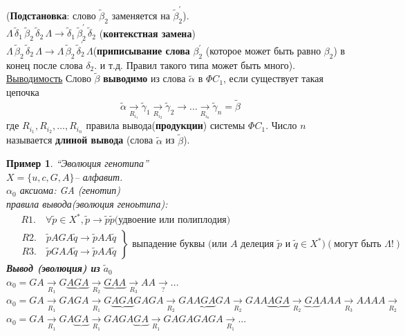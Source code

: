 \documentclass{article}
\newtheorem{example}{Пример}
\numberwithin{example}{section}
\numberwithin{question}{section}
\numberwithin{Remark}{section}
\numberwithin{theorem}{section}
\numberwithin{definition}{section}
\numberwithin{proposition}{section}
\begin{document}
(\textbf{Подстановка}: слово $\tilde{\beta}_2$ заменяется на $\tilde{\beta}_2^{'}$).\\
$\Lambda\,\tilde{\delta}_1\,\tilde{\beta}_2\,\tilde{\delta}_2\,\Lambda\rightarrow \tilde{\delta}_1\,\tilde{\beta}_2^{'}\,\tilde{\delta}_2$ (\textbf{контекстная замена})\\
$\Lambda\,\tilde{\beta}_2\,\tilde{\delta}_2\,\Lambda\rightarrow \Lambda\,\tilde{\beta}_2\,\tilde{\delta}_2^{'}\,\Lambda$(\textbf{приписывание слова} $\beta_2^{'}$ (которое может быть равно $\beta_2$) в конец после слова $\delta_2 $. и т.д. Правил такого типа может быть много).\\
\underline{Выводимость} Слово $\tilde{\beta}$ \textbf{выводимо} из слова $\tilde{\alpha}$ в $\Phi C_1$, если существует такая цепочка
\begin{equation*}
\tilde{\alpha}\xrightarrow[R_{i_1}]{}\tilde{\gamma}_1\xrightarrow[R_{i_2}]{}\tilde{\gamma}_2\rightarrow\ldots\xrightarrow[R_{i_n}]{}\tilde{\gamma}_n=\tilde{\beta}
\end{equation*}
где $R_{i_1},R_{i_2},\ldots,R_{i_n } $ правила вывода(\textbf{продукции}) системы $\Phi C_1$. Число $n$ называется \textbf{длиной вывода} (слова $\tilde{\alpha} $ из $\tilde{\beta} $).
\begin{example}
	“Эволюция генотипа”\\
	$X=\{u,c,G,A\} $– алфавит.\\
	$\alpha_0$ аксиома: GA (генотип)\\
	правила вывода(эволюция геноьтипа):\\
	\begin{equation*}
	\begin{aligned}
	&\,\,R1.\quad\forall\widetilde{p}\in X^*,            \widetilde{p}\to\widetilde{p}\widetilde{p} \text{(удвоение или полиплодия)}\\
	&\left.
	\begin{matrix}
	R2.\quad\widetilde{p}AGA\widetilde{q}\to\widetilde{p}AA\widetilde{q}\\
	R3.\quad\widetilde{p}GAA\widetilde{q}\to\widetilde{p}AA\widetilde{q}
	\end{matrix}
	\right\}\text{ выпадение буквы (или } A \text{ делеция } \widetilde{p} \text{ и } \widetilde{q} \in X^*) (\text{могут быть } \Lambda!)
	\end{aligned}
	\end{equation*}
\textbf{Вывод (эволюция) из} $\widetilde{a}_0$\\
	$\alpha_0=GA\xrightarrow[R_1]{}G\underbrace{AGA}\xrightarrow[R_2]{} \underbrace{GAA}\xrightarrow[R_3]{}AA\xrightarrow[?]{} ...$\\
	$\alpha_0=GA\xrightarrow[R_1]{} GAGA\xrightarrow[R_1]{} G\underbrace{AGA}GAGA\xrightarrow[R_2]{}GA\underbrace{AGA}GA\xrightarrow[R_2]{}GAA\underbrace{AGA}\xrightarrow[R_2]{}\underbrace{GA}AAA\xrightarrow[R_3]{}AAAA\xrightarrow[R_2]{}$\\
	$\alpha_0=GA\xrightarrow[R_1]{}GA\underbrace{GA}\xrightarrow[R_1]{}GAGA\underbrace{GA}\xrightarrow[R_1]{}GAGAGAGA\xrightarrow[R_1]{}...$\\
\end{example}
\end{document}

